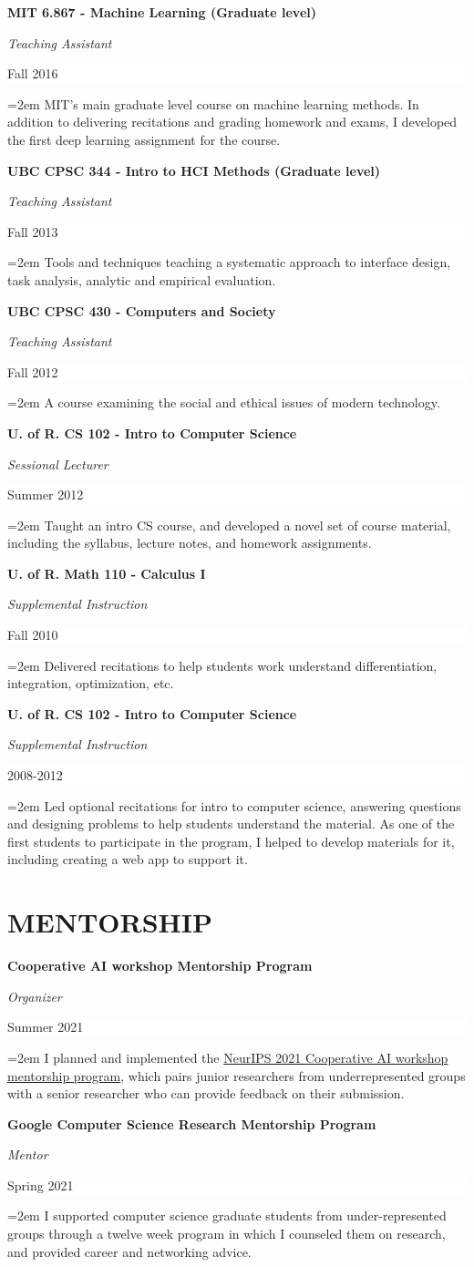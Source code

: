 \documentclass[paper=letter,fontsize=11pt]{scrartcl} %
\newcommand{\sepspace}{\vspace*{1em}}        %
\newcommand{\NewPart}[2]{\section*{\uppercase{#1} #2}}
\newcommand{\CourseEntry}[4]{
        \noindent \textbf{#1} \par
        \noindent \textit{#3} \hfill      %
        \colorbox{White}{%
            \parbox{6em}{%
            \hfill\color{Black}#2}} \par  %
        \noindent\hangindent=2em\hangafter=0 \small #4 %
        \normalsize \par}
\begin{document}
\CourseEntry{MIT 6.867 - Machine Learning (Graduate level)}{Fall 2016}{Teaching Assistant}
{MIT's main graduate level course on machine learning methods. In addition to delivering recitations and grading homework and exams, I developed the first deep learning assignment for the course.}
\sepspace

\CourseEntry{UBC CPSC 344 - Intro to HCI Methods (Graduate level)}{Fall 2013}{Teaching Assistant}
{Tools and techniques teaching a systematic approach to interface design, task analysis, analytic and empirical evaluation.}
\sepspace

\CourseEntry{UBC CPSC 430 - Computers and Society}{Fall 2012}{Teaching Assistant}
{A course examining the social and ethical issues of modern technology.}
\sepspace

\CourseEntry{U. of R. CS 102 - Intro to Computer Science}{Summer 2012}{Sessional Lecturer}
{Taught an intro CS course, and developed a novel set of course material, including the syllabus, lecture notes, and homework assignments.}
\sepspace

\CourseEntry{U. of R. Math 110 - Calculus I}{Fall 2010}{Supplemental Instruction}
{Delivered recitations to help students work understand differentiation, integration, optimization, etc.}
\sepspace

\CourseEntry{U. of R. CS 102 - Intro to Computer Science}{2008-2012}{Supplemental Instruction}
{Led optional recitations for intro to computer science, answering questions and designing problems to help students understand the material. As one of the first students to participate in the program, I helped to develop materials for it, including creating a web app to support it.}

\NewPart{Mentorship}{}
\CourseEntry{Cooperative AI workshop Mentorship Program}{Summer 2021}{Organizer}
{I planned and implemented the \href{https://www.cooperativeai.com/neurips-2021/workshop-information#h.ssihuuiopnhu}{NeurIPS 2021 Cooperative AI workshop mentorship program}, which pairs junior researchers from underrepresented groups with a senior researcher who can provide feedback on their submission.}
\sepspace

\CourseEntry{Google Computer Science Research Mentorship Program}{Spring 2021}{Mentor}
{I supported computer science graduate students from under-represented groups through a twelve week program in which I counseled them on research, and provided career and networking advice.}
\sepspace
\end{document}
